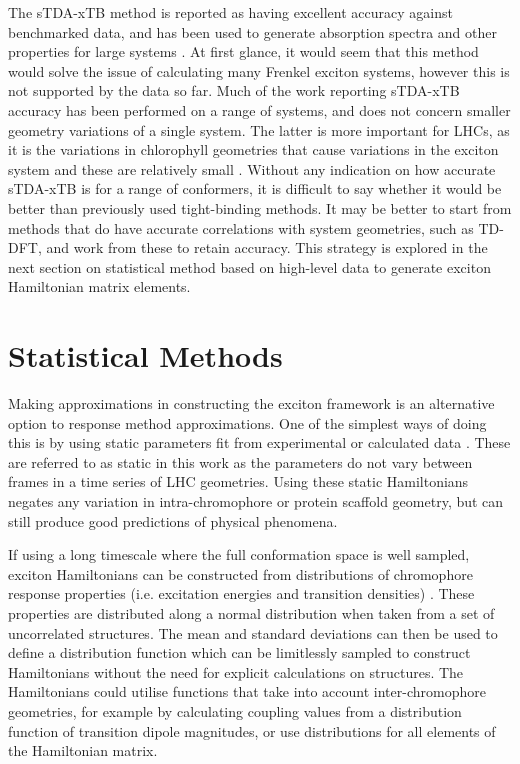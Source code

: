 The sTDA-xTB method is reported as having excellent accuracy against benchmarked
data, and has been used to generate absorption spectra and other properties for 
large systems \cite{Grimme2016, Seibert2019, Wilbraham2018, Verma2022, HeathApostolopoulos2019}. 
At first glance, it would seem that this method would solve the issue of calculating 
many Frenkel exciton systems, however this is not supported by the data so far. 
Much of the work reporting sTDA-xTB accuracy has been performed on a range of systems,
and does not concern smaller geometry variations of a single system. The latter
is more important for LHCs, as it is the variations in chlorophyll geometries that 
cause variations in the exciton system and these are relatively small \cite{Sirohiwal2020}.
Without any indication on how accurate sTDA-xTB is for a range of conformers, it 
is difficult to say whether it would be better than previously used tight-binding 
methods. It may be better to start from methods that do have accurate correlations 
with system geometries, such as TD-DFT, and work from these to retain accuracy. 
This strategy is explored in the next section on statistical method based on high-level 
data to generate exciton Hamiltonian matrix elements.

\section{Statistical Methods}
\label{sec:stats_methods}

Making approximations in constructing the exciton framework is an alternative option
to response method approximations. One of the simplest ways of doing this is by 
using static parameters fit from experimental or calculated data \cite{Cory1998, Hu1997, Tretiak2000}. 
These are referred to as static in this work as the parameters do not vary between 
frames in a time series of LHC geometries. Using these static Hamiltonians negates
any variation in intra-chromophore or protein scaffold geometry, but can still produce
good predictions of physical phenomena.

If using a long timescale where the full conformation space is well sampled, exciton
Hamiltonians can be constructed from distributions of chromophore response properties
(i.e. excitation energies and transition densities) \cite{Stross2016}. These properties
are distributed along a normal distribution when taken from a set of uncorrelated 
structures. The mean and standard deviations can then be used to define a distribution
function which can be limitlessly sampled to construct Hamiltonians without the 
need for explicit calculations on structures. The Hamiltonians could utilise functions
that take into account inter-chromophore geometries, for example by calculating 
coupling values from a distribution function of transition dipole magnitudes, or
use distributions for all elements of the Hamiltonian matrix.

